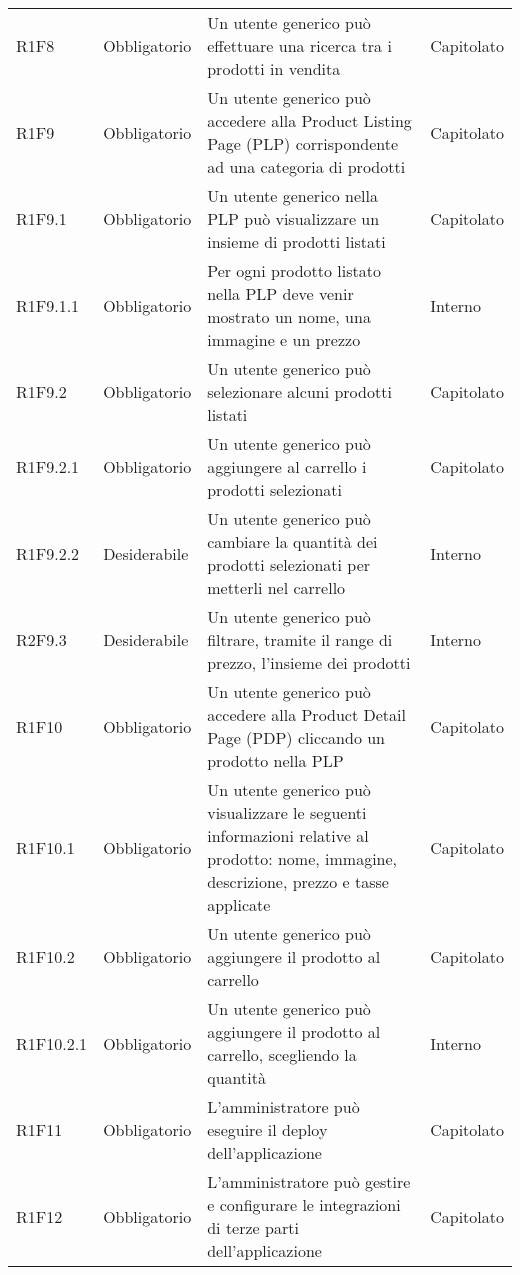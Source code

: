 {\begin{longtable}{C{2.5cm} C{2.8cm} C{6.7cm} C{2.5cm}}

R1F8 & Obbligatorio & Un utente generico può effettuare una ricerca tra i prodotti in vendita & Capitolato \\


R1F9 & Obbligatorio & Un utente generico può accedere alla Product Listing Page (PLP) corrispondente ad una categoria di prodotti & Capitolato \\
R1F9.1 & Obbligatorio & Un utente generico nella PLP può visualizzare un insieme di prodotti listati & Capitolato \\
R1F9.1.1 & Obbligatorio & Per ogni prodotto listato nella PLP deve venir mostrato un nome, una immagine e un prezzo & Interno \\
R1F9.2 & Obbligatorio & Un utente generico può selezionare alcuni prodotti listati & Capitolato \\
R1F9.2.1 & Obbligatorio & Un utente generico può aggiungere al carrello i prodotti selezionati & Capitolato \\
R1F9.2.2 & Desiderabile & Un utente generico può cambiare la quantità dei prodotti selezionati per metterli nel carrello & Interno \\
R2F9.3 & Desiderabile & Un utente generico può filtrare, tramite il range di prezzo, l'insieme dei prodotti & Interno \\


R1F10 & Obbligatorio & Un utente generico può accedere alla Product Detail Page (PDP) cliccando un prodotto nella PLP & Capitolato \\
R1F10.1 & Obbligatorio & Un utente generico può visualizzare le seguenti informazioni relative al prodotto: nome, immagine, descrizione, prezzo e tasse applicate & Capitolato \\
R1F10.2 & Obbligatorio & Un utente generico può aggiungere il prodotto al carrello & Capitolato \\
R1F10.2.1 & Obbligatorio & Un utente generico può aggiungere il prodotto al carrello, scegliendo la quantità & Interno \\


R1F11 & Obbligatorio & L'amministratore può eseguire il deploy dell'applicazione & Capitolato \\
R1F12 & Obbligatorio & L'amministratore può gestire e configurare le integrazioni di terze parti dell'applicazione & Capitolato \\

\end{longtable}

}